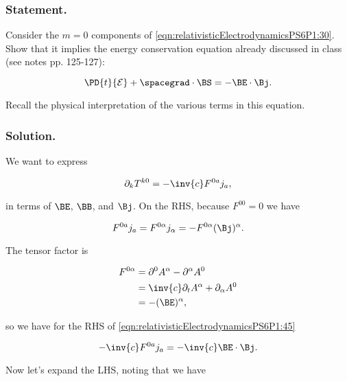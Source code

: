 \subsubsection{Statement.}

Consider the $m = 0$ components of \ref{eqn:relativisticElectrodynamicsPS6P1:30}.  Show that it implies the energy conservation equation already discussed in class (see notes pp. 125-127):

\begin{equation}\label{eqn:relativisticElectrodynamicsPS6P1:40}
\PD{t}{\mathcal{E}} + \spacegrad \cdot \BS = - \BE \cdot \Bj.
\end{equation}

Recall the physical interpretation of the various terms in this equation.

\subsubsection{Solution.}

We want to express

\begin{equation}\label{eqn:relativisticElectrodynamicsPS6P1:45}
\partial_k T^{k 0} = -\inv{c} F^{0 a} j_a,
\end{equation}

in terms of $\BE$, $\BB$, and $\Bj$.  On the RHS, because $F^{0 0} = 0$ we have

\begin{equation}\label{eqn:relativisticElectrodynamicsPS6P1:80}
F^{0 a} j_a = F^{0 \alpha} j_\alpha = -F^{0 \alpha} (\Bj)^\alpha.
\end{equation}

The tensor factor is

\begin{align*}
F^{0 \alpha} 
&= \partial^0 A^\alpha - \partial^\alpha A^0 \\
&= \inv{c} \partial_t A^\alpha + \partial_\alpha A^0 \\
&= -(\BE)^\alpha,
\end{align*}

so we have for the RHS of \ref{eqn:relativisticElectrodynamicsPS6P1:45}

\begin{equation}\label{eqn:relativisticElectrodynamicsPS6P1:100}
-\inv{c} F^{0 a} j_a = -\inv{c} \BE \cdot \Bj.
\end{equation}

Now let's expand the LHS, noting that we have

